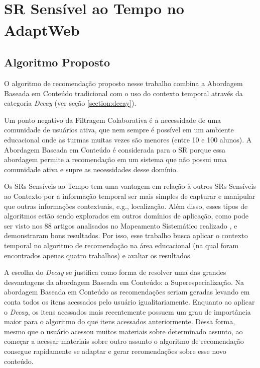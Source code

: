 \chapter{SR Sensível ao Tempo no AdaptWeb\textsuperscript{\textregistered}}

\section{Algoritmo Proposto}

O algoritmo de recomendação proposto nesse trabalho combina a Abordagem Baseada em Conteúdo tradicional com o uso do
contexto temporal através da categoria \textit{Decay} (ver seção \ref{section:decay}).

Um ponto negativo da Filtragem Colaborativa é a necessidade de uma comunidade de usuários ativa, que nem sempre é
possível em um ambiente educacional onde as turmas muitas vezes são menores (entre 10 e 100 alunos). A Abordagem Baseada
em Conteúdo é considerada para o SR porque essa abordagem permite a recomendação em um sistema que não possui uma
comunidade ativa e supre as necessidades desse domínio.

Os SRs Sensíveis ao Tempo tem uma vantagem em relação à outros SRs Sensíveis ao Contexto por a informação temporal ser
mais simples de capturar e manipular que outras informações contextuais, e.g., localização. Além disso, esses tipos de
algoritmos estão sendo explorados em outros domínios de aplicação, como pode ser visto nos 88 artigos analisados no
Mapeamento Sistemático realizado \cite{de2017time}, e demonstraram bons resultados. Por isso, esse trabalho busca
aplicar o contexto temporal no algoritmo de recomendação na área educacional (na qual foram encontrados apenas quatro
trabalhos) e avaliar os resultados.

A escolha do \textit{Decay} se justifica como forma de resolver uma das grandes desvantagens da abordagem Baseada em Conteúdo: a
Superespecialização. Na abordagem Baseada em Conteúdo as recomendações seriam geradas levando em conta todos os itens
acessados pelo usuário igualitariamente. Enquanto ao aplicar o \textit{Decay}, os itens acessados mais recentemente possuem um
grau de importância maior para o algoritmo do que itens acessados anteriormente. Dessa forma, mesmo que o usuário
acessou muitos materiais sobre determinado assunto, ao começar a acessar materiais sobre outro assunto o algoritmo de
recomendação consegue rapidamente se adaptar e gerar recomendações sobre esse novo conteúdo.

